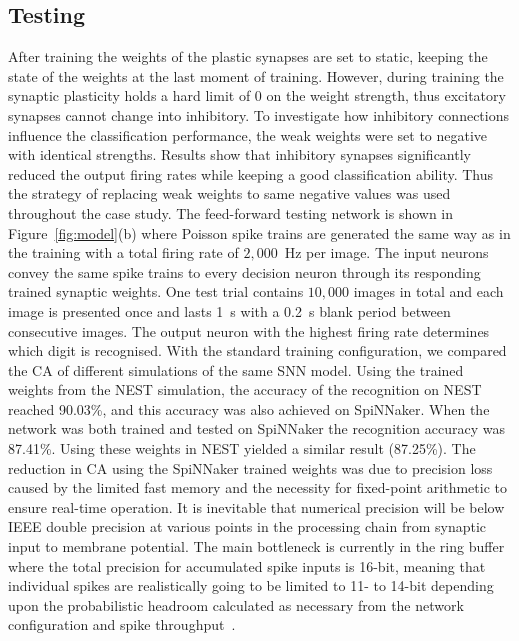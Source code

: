 \subsection{Testing}
After training the weights of the plastic synapses are set to static, keeping the state of the weights at the last moment of training.
However, during training the synaptic plasticity holds a hard limit of 0 on the weight strength, thus excitatory synapses cannot change into inhibitory.
To investigate how inhibitory connections influence the classification performance, the weak weights were set to negative with identical strengths.
Results show that inhibitory synapses significantly reduced the output firing rates while keeping a good classification ability.
Thus the strategy of replacing weak weights to same negative values was used throughout the case study.
The feed-forward testing network is shown in Figure~\ref{fig:model}(b) where Poisson spike trains are generated the same way as in the training with a total firing rate of $2,000$~Hz per image.
The input neurons convey the same spike trains to every decision neuron through its responding trained synaptic weights. 
One test trial contains $10,000$ images in total and each image is presented once and lasts 1~s with a 0.2~s blank period between consecutive images.
The output neuron with the highest firing rate determines which digit is recognised.
With the standard training configuration, we compared the CA of different simulations of the same SNN model.
Using the trained weights from the NEST simulation, the accuracy of the recognition on NEST reached 90.03\%, and this accuracy was also achieved on SpiNNaker.
When the network was both trained and tested on SpiNNaker the recognition accuracy was 87.41\%.
Using these weights in NEST yielded a similar result (87.25\%). 
The reduction in CA using the SpiNNaker trained weights was due to precision loss caused by the limited fast memory and the necessity for fixed-point arithmetic to ensure real-time operation.
It is inevitable that numerical precision will be below IEEE double precision at various points in the processing chain from synaptic input to membrane potential.
The main bottleneck is currently in the ring buffer where the total precision for accumulated spike inputs is 16-bit, meaning that individual spikes are realistically going to be limited to 11- to 14-bit depending upon the probabilistic headroom calculated as necessary from the network configuration and spike throughput~\cite{Hopkins2015Accuracy}.


